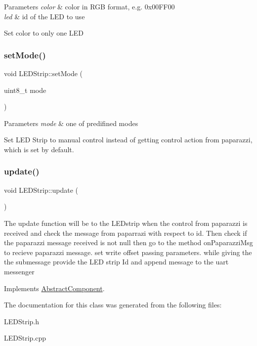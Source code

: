 \begin{DoxyParams}{Parameters}
{\em color} & color in R\+GB format, e.\+g. 0x00\+F\+F00 \\
\hline
{\em led} & id of the L\+ED to use\\
\hline
\end{DoxyParams}
Set color to only one L\+ED \mbox{\label{class_l_e_d_strip_abf199367f3caaf9730262c4e7bef6bc1}} 
\subsubsection{\texorpdfstring{set\+Mode()}{setMode()}}
{\footnotesize\ttfamily void L\+E\+D\+Strip\+::set\+Mode (\begin{DoxyParamCaption}\item[{uint8\+\_\+t}]{mode }\end{DoxyParamCaption})}


\begin{DoxyParams}{Parameters}
{\em mode} & one of predifined modes\\
\hline
\end{DoxyParams}
Set L\+ED Strip to manual control instead of getting control action from paparazzi, which is set by default. \mbox{\label{class_l_e_d_strip_abc57d90870bb0e9c0d05e7ba6ca76c95}} 
\subsubsection{\texorpdfstring{update()}{update()}}
{\footnotesize\ttfamily void L\+E\+D\+Strip\+::update (\begin{DoxyParamCaption}{ }\end{DoxyParamCaption})\hspace{0.3cm}{\ttfamily [virtual]}}

The update function will be to the L\+E\+Dstrip when the control from paparazzi is received and check the message from paparrazi with respect to id. Then check if the paparazzi message received is not null then go to the method on\+Paparazzi\+Msg to recieve paparazzi message. set write offset passing parameters. while giving the the submessage provide the L\+ED strip Id and append message to the uart messenger 

Implements \hyperlink{class_abstract_component}{Abstract\+Component}.



The documentation for this class was generated from the following files\+:\begin{DoxyCompactItemize}
\item 
L\+E\+D\+Strip.\+h\item 
L\+E\+D\+Strip.\+cpp\end{DoxyCompactItemize}
